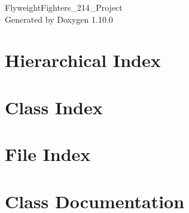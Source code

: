 \documentclass[twoside]{book}
\newcommand{\+}{\discretionary{\mbox{\scriptsize$\hookleftarrow$}}{}{}}
\newcommand{\clearemptydoublepage}{%
    \newpage{\pagestyle{empty}\cleardoublepage}%
  }
\begin{document}
  \raggedbottom
    \hypersetup{pageanchor=false,
                bookmarksnumbered=true,
                pdfencoding=unicode
               }
  \begin{titlepage}
  \vspace*{7cm}
  \begin{center}%
  {\Large Flyweight\+Fighters\+\_\+214\+\_\+\+Project}\\
  \vspace*{1cm}
  {\large Generated by Doxygen 1.10.0}\\
  \end{center}
  \end{titlepage}
  \clearemptydoublepage
  \tableofcontents
  \clearemptydoublepage
  \hypersetup{pageanchor=true}

\chapter{Hierarchical Index}

\chapter{Class Index}

\chapter{File Index}

\chapter{Class Documentation}



















































\end{document}
